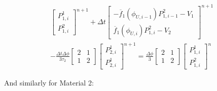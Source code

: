 \documentclass[12pt,a4paper,pagesize=pdftex]{scrartcl}
\begin{document}
\begin{multline*}
    \begin{bmatrix}
        P^1_{1,i} \\
        P^2_{1,i}
    \end{bmatrix}^{n+1}
    + \Delta t
    \begin{bmatrix}
        - \overline{f}_1\left(\phi_{U,i-1}\right) P^2_{1,i-1} - V_1 \\
        \overline{f}_1\left(\phi_{U,i}\right) P^2_{1,i} - V_2
    \end{bmatrix}^{n+1} \\
    - \frac{\Delta t \Delta \phi}{3 \tau_2}
    \begin{bmatrix}
        2 & 1 \\
        1 & 2
    \end{bmatrix}
    \begin{bmatrix}
        P_{2,i}^1 \\
        P_{2,i}^1
    \end{bmatrix}^{n+1}
    = \frac{\Delta \phi}{3}
    \begin{bmatrix}
        2 & 1 \\
        1 & 2
    \end{bmatrix}
    \begin{bmatrix}
        P_{1,i}^1 \\
        P_{1,i}^2
    \end{bmatrix}^n
\end{multline*}

And similarly for Material 2:
\end{document}
